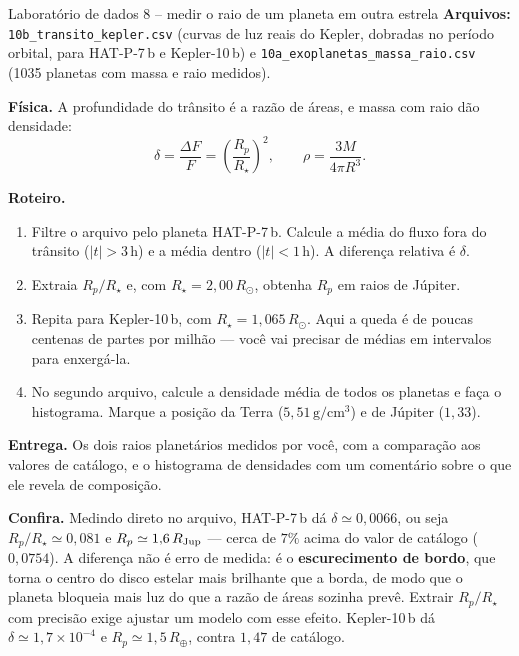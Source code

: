\documentclass[11pt,a4paper]{article}
\begin{document}
\begin{lessonblock}[borderline west={2pt}{0pt}{astroGold}]{Laboratório de dados 8 -- medir o raio de um planeta em outra estrela}
\textbf{Arquivos:} \texttt{10b\_transito\_kepler.csv} (curvas de luz reais do Kepler, dobradas no período orbital, para HAT-P-7\,b e Kepler-10\,b) e \texttt{10a\_exoplanetas\_massa\_raio.csv} (1035 planetas com massa e raio medidos).

\textbf{Física.} A profundidade do trânsito é a razão de áreas, e massa com raio dão densidade:
\[
\delta=\frac{\Delta F}{F}=\left(\frac{R_p}{R_\star}\right)^{2},
\qquad
\rho=\frac{3M}{4\pi R^{3}}.
\]

\textbf{Roteiro.}
\begin{enumerate}
\item Filtre o arquivo pelo planeta HAT-P-7\,b. Calcule a média do fluxo fora do trânsito ($|t|>3\,\mathrm{h}$) e a média dentro ($|t|<1\,\mathrm{h}$). A diferença relativa é $\delta$.
\item Extraia $R_p/R_\star$ e, com $R_\star=2{,}00\,R_\odot$, obtenha $R_p$ em raios de Júpiter.
\item Repita para Kepler-10\,b, com $R_\star=1{,}065\,R_\odot$. Aqui a queda é de poucas centenas de partes por milhão --- você vai precisar de médias em intervalos para enxergá-la.
\item No segundo arquivo, calcule a densidade média de todos os planetas e faça o histograma. Marque a posição da Terra ($5{,}51\,\mathrm{g/cm^3}$) e de Júpiter ($1{,}33$).
\end{enumerate}

\textbf{Entrega.} Os dois raios planetários medidos por você, com a comparação aos valores de catálogo, e o histograma de densidades com um comentário sobre o que ele revela de composição.

\textbf{Confira.} Medindo direto no arquivo, HAT-P-7\,b dá $\delta\simeq0{,}0066$, ou seja $R_p/R_\star\simeq0{,}081$ e $R_p\simeq1{,}6\,R_{\rm Jup}$ --- cerca de $7\%$ acima do valor de catálogo ($0{,}0754$). A diferença não é erro de medida: é o \textbf{escurecimento de bordo}, que torna o centro do disco estelar mais brilhante que a borda, de modo que o planeta bloqueia mais luz do que a razão de áreas sozinha prevê. Extrair $R_p/R_\star$ com precisão exige ajustar um modelo com esse efeito. Kepler-10\,b dá $\delta\simeq1{,}7\times10^{-4}$ e $R_p\simeq1{,}5\,R_\oplus$, contra $1{,}47$ de catálogo.
\end{lessonblock}

\newpage
\end{document}
